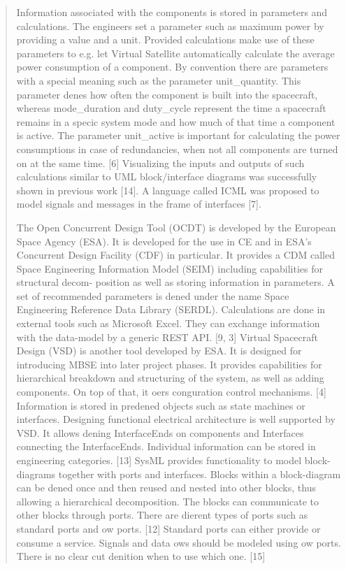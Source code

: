 \begin{quote}
Information associated with the components is stored in parameters and calculations. The engineers
set a parameter such as maximum power by providing a value and a unit. Provided calculations make use
of these parameters to e.g. let Virtual Satellite automatically calculate the average power consumption
of a component. By convention there are parameters with a special meaning such as the parameter
unit_quantity. This parameter denes how often the component is built into the spacecraft, whereas
mode_duration and duty_cycle represent the time a spacecraft remains in a specic system mode and
how much of that time a component is active. The parameter unit_active is important for calculating the
power consumptions in case of redundancies, when not all components are turned on at the same time.
[6] Visualizing the inputs and outputs of such calculations similar to UML block/interface diagrams was
successfully shown in previous work [14]. A language called ICML was proposed to model signals and
messages in the frame of interfaces [7].

The Open Concurrent Design Tool (OCDT) is developed by the European Space Agency (ESA). It is
developed for the use in CE and in ESA's Concurrent Design Facility (CDF) in particular. It provides a
CDM called Space Engineering Information Model (SEIM) including capabilities for structural decom-
position as well as storing information in parameters. A set of recommended parameters is dened under
the name Space Engineering Reference Data Library (SERDL). Calculations are done in external tools
such as Microsoft Excel. They can exchange information with the data-model by a generic REST API.
[9, 3]
Virtual Spacecraft Design (VSD) is another tool developed by ESA. It is designed for introducing
MBSE into later project phases. It provides capabilities for hierarchical breakdown and structuring of
the system, as well as adding components. On top of that, it oers conguration control mechanisms.
[4] Information is stored in predened objects such as state machines or interfaces. Designing functional
electrical architecture is well supported by VSD. It allows dening InterfaceEnds on components and
Interfaces connecting the InterfaceEnds. Individual information can be stored in engineering categories.
[13]
SysML provides functionality to model block-diagrams together with ports and interfaces. Blocks
within a block-diagram can be dened once and then reused and nested into other blocks, thus allowing
a hierarchical decomposition. The blocks can communicate to other blocks through ports. There are
dierent types of ports such as standard ports and ow ports. [12] Standard ports can either provide
or consume a service. Signals and data ows should be modeled using ow ports. There is no clear cut
denition when to use which one. [15]


\end{quote}
